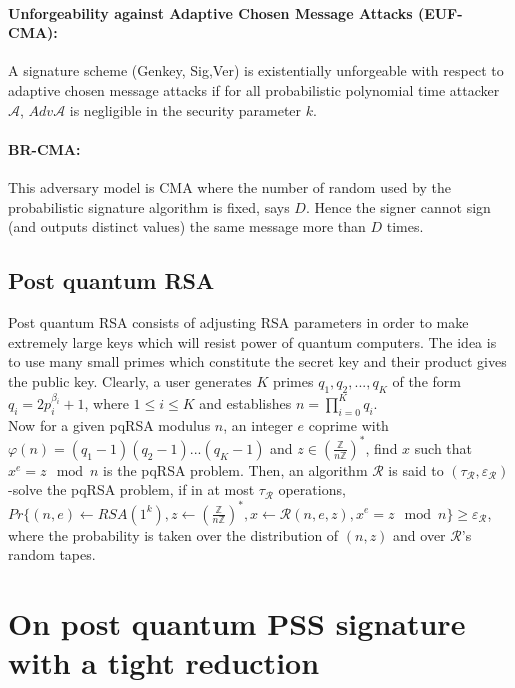 \documentclass[a4paper,11pt]{article}
\begin{document}
\paragraph{Unforgeability against Adaptive Chosen Message Attacks (EUF-CMA):}  A signature scheme (Genkey, Sig,Ver)
is existentially unforgeable with respect to adaptive chosen message attacks if for all probabilistic polynomial
 time attacker $\mathcal{A}$, $Adv\mathcal{A}$ is negligible in  the security parameter $k$.

\paragraph{BR-CMA:} This adversary model is CMA where the number of random used by the probabilistic signature algorithm is fixed, says $D$. Hence the signer cannot sign (and outputs distinct values) the same message more than $D$ times.

\subsection{Post quantum RSA }\label{sec:one:3}
Post quantum RSA consists of adjusting RSA parameters in order to make extremely large keys which will resist power of quantum computers. The idea is to use many small primes which constitute the secret key and their product gives the public key. Clearly, a user generates $K$ primes $q_1,q_2,...,q_K$ of the form $q_i=2p_i^{\beta_i}+1$, where $ 1\leq i\leq K$ and establishes $n=\prod_{i=0}^{K}{q_i}$.\\
Now for a given pqRSA modulus  $n$, an integer $e$ coprime with $\varphi (n)=(q_1-1)(q_2-1)...(q_K-1)$ and $z \in (\frac{\mathbb{Z}}{n\mathbb{Z}})^{*}$, find $x$ such that $x^{e} = z  \mod n$ is the pqRSA problem. Then, an algorithm $\mathcal{R}$ is said to $(\tau_{\mathcal{R}} , \varepsilon_{\mathcal{R}} )$-solve the pqRSA
problem, if in at most $\tau_{\mathcal{R}}$ operations, $Pr \lbrace (n,e) \leftarrow RSA(1^{k} ), z \leftarrow (\frac{\mathbb{Z}}{n\mathbb{Z}})^{*} , x \leftarrow \mathcal{R}(n, e, z), x^{e} = z \mod n\rbrace \geq \varepsilon_{\mathcal{R}} $, where the probability is taken over the distribution of $(n, z)$ and over $\mathcal{\mathcal{R}}$'s  random tapes.


\section{On post quantum PSS signature with a tight reduction}\label{sec:two}
\end{document}
